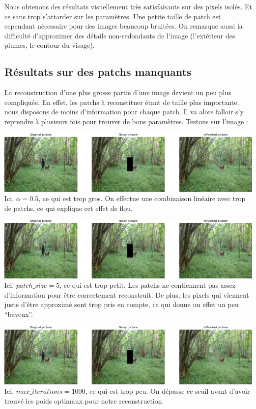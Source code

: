 \documentclass[a4paper]{memoir}
\begin{document}
Nous obtenons des résultats visuellement très satisfaisants sur des pixels isolés. Et ce sans trop s'attarder sur les paramètres. Une petite taille de patch est cependant nécessaire pour des images beaucoup bruitées. On remarque aussi la difficulté d'approximer des détails non-redondants de l'image (l’extérieur des plumes, le contour du visage).


\newpage
\subsection{Résultats sur des patchs manquants}
La reconstruction d'une plus grosse partie d'une image devient un peu plus compliquée. En effet, les patchs à reconstituer étant de taille plus importante, nous disposons de moins d'information pour chaque patch. Il va alors falloir s'y reprendre à plusieurs fois pour trouver de bons paramètres. Testons sur l'image  :

\begin{center}
\includegraphics[scale=0.4]{res/outdoor_gros_alpha.png}\\
\small{Ici, $\alpha=0.5$, ce qui est trop gros. On effectue une combinaison linéaire avec trop de patchs, ce qui explique cet effet de flou.}
\end{center}

\begin{center}
\includegraphics[scale=0.4]{res/outdoor_petit_patch.png}\\
\small{Ici, $patch\_size=5$, ce qui est trop petit. Les patchs ne contiennent pas assez d'information pour être correctement reconstruit. De plus, les pixels qui viennent juste d'être approximé sont trop pris en compte, ce qui donne un effet un peu ``baveux''.}
\end{center}


\begin{center}
\includegraphics[scale=0.4]{res/outdoor_peu_iter.png}\\
\small{Ici, $max\_iterations=1000$, ce qui est trop peu. On dépasse ce seuil avant d'avoir trouvé les poids optimaux pour notre reconstruction.}
\end{center}
\end{document}

